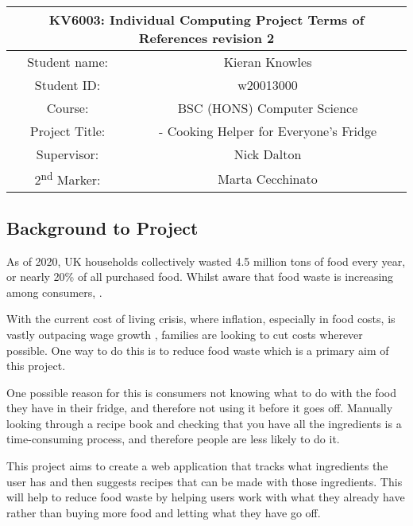 \documentclass[../CHEFCookingHelper.tex]{subfiles}
\begin{document}
\newcommand{\torrevision}{2}

\begin{table}[h!]
    \centering
    \begin{tabular}{|c|c|}
        \hline
        \multicolumn{2}{|c|}{KV6003: Individual Computing Project Terms of References revision \torrevision{}} \\\hline
        Student name: & Kieran Knowles \\\hline
        Student ID: & w20013000 \\\hline
        Course: & BSC (HONS) Computer Science \\\hline
        Project Title: & \chef{} - Cooking Helper for Everyone's Fridge \\\hline
        Supervisor: & Nick Dalton \\\hline
        2\textsuperscript{nd} Marker: & Marta Cecchinato \\\hline
    \end{tabular}
\end{table}

\subsection{Background to Project}
As of 2020, UK households collectively wasted 4.5 million tons of food every year, or nearly 20\% of all purchased food.
Whilst aware that food waste is increasing among consumers,  \cite{wrap_uk_2020}.

With the current cost of living crisis, where inflation, especially in food costs, is vastly outpacing wage growth \cite{office_for_national_statistics_average_2023}
\cite{francis-devine_rising_2023}, families are looking to cut costs wherever possible. One way to do this is to reduce food waste which is a
primary aim of this project.

One possible reason for this is consumers not knowing what to do with the food they have in their fridge, and therefore not using it before it goes off.
Manually looking through a recipe book and checking that you have all the ingredients is a time-consuming process, and therefore people are less likely to do it.

This project aims to create a web application that tracks what ingredients the user has and then suggests recipes that can be made with those ingredients.
This will help to reduce food waste by helping users work with what they already have rather than buying more food and letting what they have go off.
\end{document}

